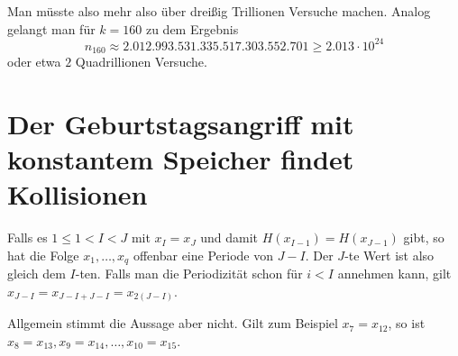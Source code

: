 \documentclass{../crypto}
\begin{document}
Man müsste also mehr also über dreißig Trillionen
Versuche machen. Analog gelangt man für $k=160$ zu dem Ergebnis 
\begin{equation*}
   n_{160} \approx 2.012.993.531.335.517.303.552.701 \ge 2.013 \cdot 10^{24}
\end{equation*}
oder etwa $2$ Quadrillionen Versuche.

\section{Der Geburtstagsangriff mit konstantem Speicher findet Kollisionen}

Falls es $1 \le 1 < I < J$ mit $x_I = x_J$ und damit $H(x_{I-1}) = H(x_{J-1})$
gibt, so hat die Folge $x_1,\ldots,x_q$ offenbar eine Periode von $J - I$. Der
$J$-te Wert ist also gleich dem $I$-ten. Falls man die Periodizität schon für $i
< I$ annehmen kann, gilt $x_{J-I} = x_{J-I + J-I} = x_{2(J-I)}$.

Allgemein stimmt die Aussage aber nicht. Gilt zum Beispiel $x_7 = x_{12}$, so
ist $x_8 = x_{13}, x_9 = x_{14},\ldots,x_{10} = x_{15}$.
\end{document}
